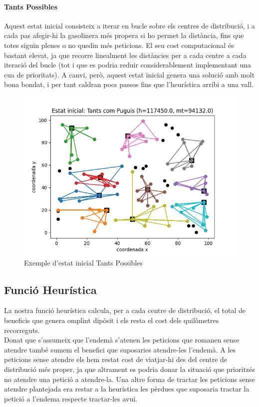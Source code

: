 \documentclass[a4paper]{article}
\begin{document}
\paragraph{Tants Possibles}
Aquest estat inicial consisteix a iterar en bucle sobre els centres de distribució, i a cada pas afegir-hi la gasolinera més propera si ho permet la distància, fins que totes siguin plenes o no quedin més peticions. El seu cost computacional és bastant elevat, ja que recorre linealment les distàncies per a cada centre a cada iteració del bucle (tot i que es podria reduir considerablement implementant una cua de prioritats). A canvi, però, aquest estat inicial genera una solució amb molt bona bondat, i per tant caldran pocs passos fins que l'heurística arribi a una vall.

\begin{figure}[th]
\centering
\includegraphics[scale=0.6]{images/fig5.png}
\caption{Exemple d'estat inicial Tants Possibles}
\end{figure}

\subsection{Funció Heurística}
La nostra funció heurística calcula, per a cada centre de distribució, el total de beneficis que genera omplint dipòsit i els resta el cost dels quilòmetres recorreguts.\\

Donat que s'assumeix que l'endemà s'atenen les peticions que romanen sense atendre també sumem el benefici que suposaries atendre-les l'endemà. A les peticions sense atendre els hem restat cost de viatjar-hi des del centre de distribució més proper, ja que altrament es podria donar la situació que prioritzés no atendre una petició a atendre-la. Una altre forma de tractar les peticions sense atendre plantejada era restar a la heurística les pèrdues que suposaria tractar la petició a l'endema respecte tractar-les avui.\\
\end{document}
